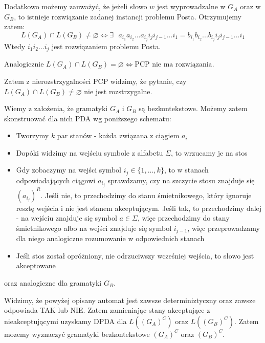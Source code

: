 \documentclass[12pt]{article}
\begin{document}
    \newpage

    \noindent Dodatkowo możemy zauważyć, że jeżeli słowo $w$ jest wyprowadzalne w $G_A$ oraz w $G_B$, to istnieje rozwiązanie zadanej instancji problemu Posta. Otrzymujemy zatem:
    $$
        L(G_A) \cap L(G_B) \ne \varnothing \iff \exists \text{ } a_{i_1}a_{i_2}...a_{i_j}i_ji_{j - 1}...i_1 = b_{i_1}b_{i_2}...b_{i_j}i_ji_{j - 1}...i_1
    $$
    \noindent Wtedy $i_1i_2...i_j$ jest rozwiązaniem problemu Posta.

    \noindent Analogicznie $L(G_A) \cap L(G_B) = \varnothing \iff \text{PCP nie ma rozwiązania}$.

    \noindent Zatem z nierozstrzygalności PCP widzimy, że pytanie, czy $L(G_A) \cap L(G_B) \ne \varnothing$ nie jest rozstrzygalne.

    \noindent \newline

    \noindent Wiemy z założenia, że gramatyki $G_A$ i $G_B$ są bezkontekstowe. Możemy zatem skonstruować dla nich PDA wg poniższego schematu:

    \begin{itemize}
        \item Tworzymy $k$ par stanów - każda związana z ciągiem $a_i$
        \item Dopóki widzimy na wejściu symbole z alfabetu $\Sigma$, to wrzucamy je na stos
        \item Gdy zobaczymy na wejści symbol $i_j \in \{1, ..., k\}$, to w stanach odpowiadających ciągowi $a_{i_j}$ sprawdzamy, czy na szczycie stosu znajduje się $(a_{i_j})^R$. Jeśli nie, to przechodzimy do stanu śmietnikowego, który ignoruje resztę wejścia i nie jest stanem akceptującym. Jeśli tak, to przechodzimy dalej - na wejściu znajduje się symbol $a \in \Sigma$, więc przechodzimy do stany śmietnikowego albo na wejści znajduje się symbol $i_{j - 1}$, więc przeprowadzamy dla niego analogiczne rozumowanie w odpowiednich stanach
        \item Jeśli stos został opróżniony, nie odrzuciwszy wcześniej wejścia, to słowo jest akceptowane
    \end{itemize}
    \noindent oraz analogiczne dla gramatyki $G_B$.

    \noindent \newline

    \noindent Widzimy, że powyżej opisany automat jest zawsze determiniztyczny oraz zawsze odpowiada TAK lub NIE. Zatem zamieniając stany akceptujące z nieakceptującymi uzyskamy DPDA dla $L((G_A)^C)$ oraz $L((G_B)^C)$. Zatem mozemy wyznaczyć gramatyki bezkontekstowe $(G_A)^C$ oraz $(G_B)^C$.
\end{document}
